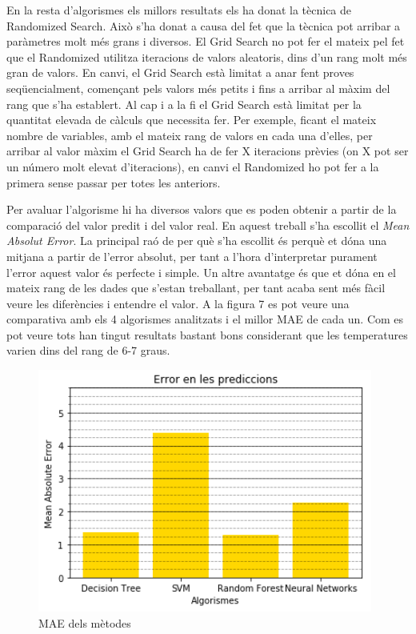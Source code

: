 \documentclass[10pt,a4paper,twocolumn,twoside]{article}
\begin{document}
En la resta d'algorismes els millors resultats els ha donat la tècnica de Randomized Search. Això s'ha donat a causa del fet que la tècnica pot arribar a paràmetres molt més grans i diversos. El Grid Search no pot fer el mateix pel fet que el Randomized utilitza iteracions de valors aleatoris, dins d'un rang molt més gran de valors. En canvi, el Grid Search està limitat a anar fent proves seqüencialment, començant pels valors més petits i fins a arribar al màxim del rang que s'ha establert. Al cap i a la fi el Grid Search està limitat per la quantitat elevada de càlculs que necessita fer. Per exemple, ficant el mateix nombre de variables, amb el mateix rang de valors en cada una d'elles, per arribar al valor màxim el Grid Search ha de fer X iteracions prèvies (on X pot ser un número molt elevat d'iteracions), en canvi el Randomized ho pot fer a la primera sense passar per totes les anteriors.

Per avaluar l'algorisme hi ha diversos valors que es poden obtenir a partir de la comparació del valor predit i del valor real. En aquest treball s'ha escollit el \textit{Mean Absolut Error}. La principal raó de per què s'ha escollit és perquè et dóna una mitjana a partir de l'error absolut, per tant a l'hora d'interpretar purament l'error aquest valor és perfecte i simple. Un altre avantatge és que et dóna en el mateix rang de les dades que s'estan treballant, per tant acaba sent més fàcil veure les diferències i entendre el valor. A la figura 7 es pot veure una comparativa amb els 4 algorismes analitzats i el millor MAE de cada un. Com es pot veure tots han tingut resultats bastant bons considerant que les temperatures varien dins del rang de 6-7 graus.

\begin{figure}[!h]
	\includegraphics[scale=0.8,center]{../img/comparacioMetricsAlgs}
	\caption{MAE dels mètodes}
	\label{fig-Metrics}
\end{figure}
\end{document}
